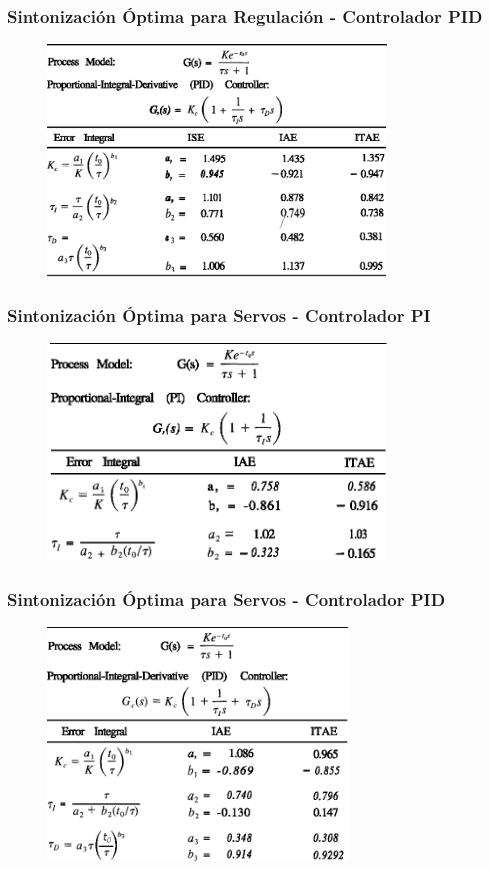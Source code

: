 \documentclass[aspectratio=169]{beamer}
\theoremstyle{definition}
\theoremstyle{plain}
\theoremstyle{remark}
\begin{document}
\begin{frame}[<+->]\frametitle{Sintonización Óptima para Regulación - Controlador PID}
\begin{figure}
	\includegraphics[width=9cm]{images/criteriosOptimosPID.eps}
\end{figure}
\end{frame}

\begin{frame}[<+->]\frametitle{Sintonización Óptima para Servos - Controlador PI}
\begin{figure}
	\includegraphics[width=9cm]{images/criteriosOptimosServoPI.eps}
\end{figure}
\end{frame}

\begin{frame}[<+->]\frametitle{Sintonización Óptima para Servos - Controlador PID}
\begin{figure}
	\includegraphics[width=8cm]{images/criteriosOptimosServoPID.eps}
\end{figure}
\end{frame}
\end{document}
